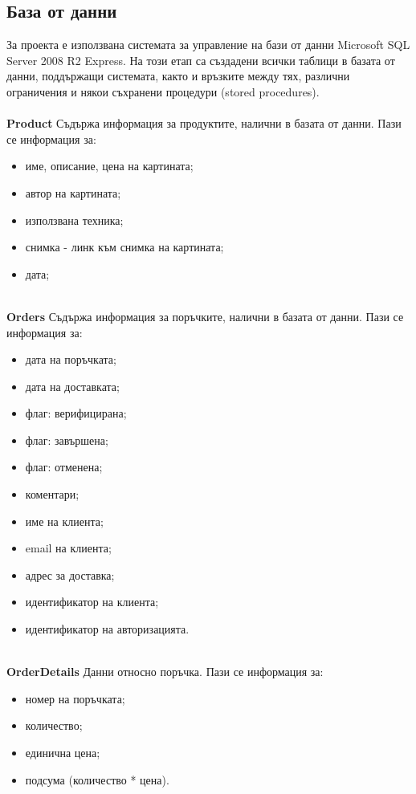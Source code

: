 \documentclass[a4paper,14pt]{article}
\begin{document}
\subsection{База от данни}
За проекта е използвана системата за управление на бази от данни Microsoft SQL Server
2008 R2 Express. На този етап са създадени всички таблици в базата от данни, поддържащи
системата, както и връзките между тях, различни ограничения и някои съхранени процедури
(stored procedures).
\\
\\
\textbf{Product} Съдържа информация за продуктите, налични в базата от данни. Пази се информация за:
\begin{itemize}
\item име, описание, цена на картината;
\item автор на картината;
\item използвана техника;
\item снимка - линк към снимка на картината;
\item дата;
\end{itemize}
\\
\textbf{Orders} Съдържа информация за поръчките, налични в базата от данни. Пази се информация за:
\begin{itemize}
\item дата на поръчката;
\item дата на доставката;
\item флаг: верифицирана;
\item флаг: завършена;
\item флаг: отменена;
\item коментари;
\item име на клиента;
\item email на клиента;
\item адрес за доставка;
\item идентификатор на клиента;
\item идентификатор на авторизацията.
\end{itemize}
\\
\textbf{OrderDetails} Данни относно поръчка. Пази се информация за:
\begin{itemize}
\item номер на поръчката;
\item количество;
\item единична цена;
\item подсума (количество * цена).
\end{itemize}
\\
\end{document}
